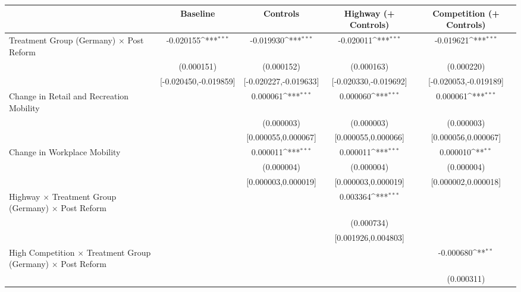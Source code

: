 {
\def\sym#1{\ifmmode^{#1}\else\(^{#1}\)\fi}
\begin{tabular}{l*{4}{c}}
\toprule
                    &\multicolumn{1}{c}{Baseline}&\multicolumn{1}{c}{Controls}&\multicolumn{1}{c}{Highway (+ Controls)}&\multicolumn{1}{c}{Competition (+ Controls)}\\
\midrule
Treatment Group (Germany) $\times$ Post Reform&   -0.020155\sym{***}&   -0.019930\sym{***}&   -0.020011\sym{***}&   -0.019621\sym{***}\\
                    &  (0.000151)         &  (0.000152)         &  (0.000163)         &  (0.000220)         \\
                    &[-0.020450,-0.019859]         &[-0.020227,-0.019633]         &[-0.020330,-0.019692]         &[-0.020053,-0.019189]         \\
Change in Retail and Recreation Mobility&                     &    0.000061\sym{***}&    0.000060\sym{***}&    0.000061\sym{***}\\
                    &                     &  (0.000003)         &  (0.000003)         &  (0.000003)         \\
                    &                     &[0.000055,0.000067]         &[0.000055,0.000066]         &[0.000056,0.000067]         \\
Change in Workplace Mobility&                     &    0.000011\sym{***}&    0.000011\sym{***}&    0.000010\sym{**} \\
                    &                     &  (0.000004)         &  (0.000004)         &  (0.000004)         \\
                    &                     &[0.000003,0.000019]         &[0.000003,0.000019]         &[0.000002,0.000018]         \\
Highway $\times$ Treatment Group (Germany) $\times$ Post Reform&                     &                     &    0.003364\sym{***}&                     \\
                    &                     &                     &  (0.000734)         &                     \\
                    &                     &                     &[0.001926,0.004803]         &                     \\
High Competition $\times$ Treatment Group (Germany) $\times$ Post Reform&                     &                     &                     &   -0.000680\sym{**} \\
                    &                     &                     &                     &  (0.000311)         \\

\end{tabular}}
